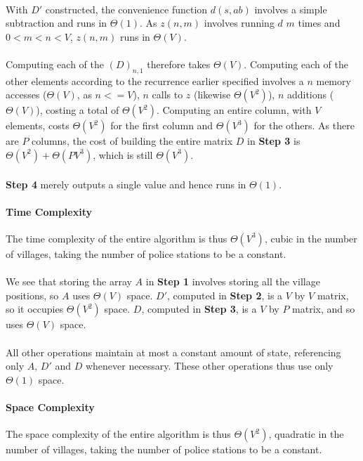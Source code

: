 \documentclass[twocolumn]{article}
\begin{document}
		\paragraph{}
		With $D'$ constructed, the convenience function $d(s, a b)$ involves a simple subtraction and runs in $\Theta(1)$. As $z(n, m)$ involves running $d$ $m$ times and $0 < m < n < V$, $z(n, m)$ runs in $\Theta(V)$.
		
		\paragraph{}
		Computing each of the $(D)_{n, 1}$ therefore takes $\Theta(V)$. Computing each of the other elements according to the recurrence earlier specified involves a $n$ memory accesses ($\Theta(V)$, as $n <= V$), $n$ calls to $z$ (likewise $\Theta(V^2)$), $n$ additions ($\Theta(V)$), costing a total of $\Theta(V^2)$. Computing an entire column, with $V$ elements, costs $\Theta(V^2)$ for the first column and $\Theta(V^3)$ for the others. As there are $P$ columns, the cost of building the entire matrix $D$ in \textbf{Step 3} is $\Theta(V^2) + \Theta(P V^3)$, which is still $\Theta(V^3)$.
		
		\paragraph{}
		\textbf{Step 4} merely outputs a single value and hence runs in $\Theta(1)$.
		
		\paragraph{Time Complexity}
		The time complexity of the entire algorithm is thus $\Theta(V^3)$, cubic in the number of villages, taking the number of police stations to be a constant.
		
		\paragraph{}
		We see that storing the array $A$ in \textbf{Step 1} involves storing all the village positions, so $A$ uses $\Theta(V)$ space. $D'$, computed in \textbf{Step 2}, is a $V$ by $V$ matrix, so it occupies $\Theta(V^2)$ space. $D$, computed in \textbf{Step 3}, is a $V$ by $P$ matrix, and so uses $\Theta(V)$ space.
		
		\paragraph{}
		All other operations maintain at most a constant amount of state, referencing only $A$, $D'$ and $D$ whenever necessary. These other operations thus use only $\Theta(1)$ space.
		
		\paragraph{Space Complexity}
		The space complexity of the entire algorithm is thus $\Theta(V^2)$, quadratic in the number of villages, taking the number of police stations to be a constant.
	
	
\end{document}
